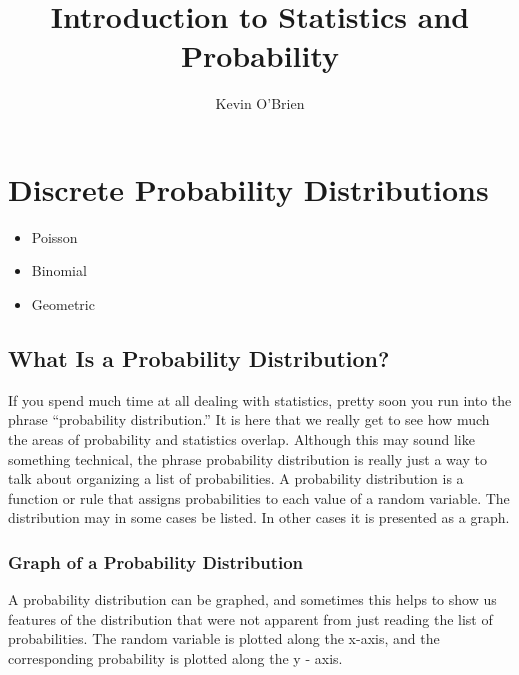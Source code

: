 \documentclass[12pt]{article}
\title{Introduction to Statistics and Probability}
\author{Kevin O'Brien}
\begin{document}
\maketitle
\newpage
\tableofcontents


\newpage


\newpage
\section{Discrete Probability Distributions}

\begin{itemize}
\item Poisson
\item Binomial
\item Geometric
\end{itemize}


\subsection{What Is a Probability Distribution?}
If you spend much time at all dealing with statistics, pretty soon you run into the phrase “probability distribution.” It is here that we really get to see how much the areas of probability and statistics overlap. Although this may sound like something technical, the phrase probability distribution is really just a way to talk about organizing a list of probabilities. A probability distribution is a function or rule that assigns probabilities to each value of a random variable. The distribution may in some cases be listed. In other cases it is presented as a graph.


\subsubsection{Graph of a Probability Distribution}

A probability distribution can be graphed, and sometimes this helps to show us features of the distribution that were not apparent from just reading the list of probabilities. The random variable is plotted along the x-axis, and the corresponding probability is plotted along the y - axis.
\end{document}
